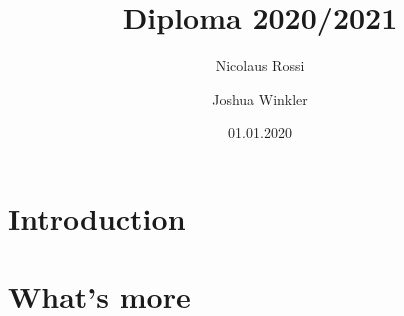 \documentclass{article}
\begin{document}
\title{Diploma 2020/2021}
\author{Nicolaus Rossi \and Joshua Winkler}
\date{01.01.2020}
\maketitle

\section{Introduction}

\section{What's more}

\end{document}
